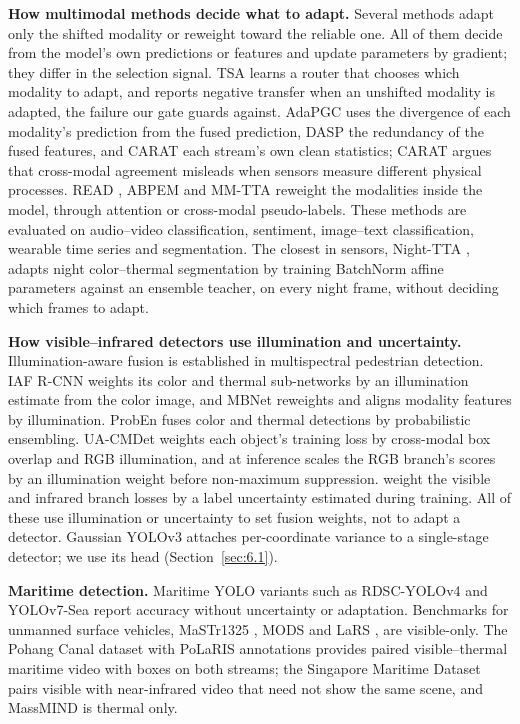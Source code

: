 \documentclass[journal]{IEEEtran}
\begin{document}
\textbf{How multimodal methods decide what to adapt.} Several methods adapt only the shifted modality or reweight toward the reliable one. All of them decide from the model's own predictions or features and update parameters by gradient; they differ in the selection signal. TSA \cite{chen2025testtime} learns a router that chooses which modality to adapt, and reports negative transfer when an unshifted modality is adapted, the failure our gate guards against. AdaPGC \cite{xu2026multimodal} uses the divergence of each modality's prediction from the fused prediction, DASP \cite{he2026decoupling} the redundancy of the fused features, and CARAT \cite{mohapatra2026sourcelearned} each stream's own clean statistics; CARAT argues that cross-modal agreement misleads when sensors measure different physical processes. READ \cite{yang2024testtime}, ABPEM \cite{zhao2025attention} and MM-TTA \cite{shin2022mmtta} reweight the modalities inside the model, through attention or cross-modal pseudo-labels. These methods are evaluated on audio--video classification, sentiment, image--text classification, wearable time series and segmentation. The closest in sensors, Night-TTA \cite{liu2024testtime}, adapts night color--thermal segmentation by training BatchNorm affine parameters against an ensemble teacher, on every night frame, without deciding which frames to adapt.

\textbf{How visible--infrared detectors use illumination and uncertainty.} Illumination-aware fusion is established in multispectral pedestrian detection. IAF R-CNN \cite{li2019illuminationaware} weights its color and thermal sub-networks by an illumination estimate from the color image, and MBNet \cite{zhou2020improving} reweights and aligns modality features by illumination. ProbEn \cite{chen2022multimodal} fuses color and thermal detections by probabilistic ensembling. UA-CMDet \cite{sun2022dronebased} weights each object's training loss by cross-modal box overlap and RGB illumination, and at inference scales the RGB branch's scores by an illumination weight before non-maximum suppression. \citet{zhao2024uncertaintyaware} weight the visible and infrared branch losses by a label uncertainty estimated during training. All of these use illumination or uncertainty to set fusion weights, not to adapt a detector. Gaussian YOLOv3 \cite{choi2019gaussian} attaches per-coordinate variance to a single-stage detector; we use its head (Section~\ref{sec:6.1}).

\textbf{Maritime detection.} Maritime YOLO variants such as RDSC-YOLOv4 \cite{liu2021sea} and YOLOv7-Sea \cite{zhao2023yolov7sea} report accuracy without uncertainty or adaptation. Benchmarks for unmanned surface vehicles, MaSTr1325 \cite{bovcon2019the}, MODS \cite{bovcon2022mods} and LaRS \cite{zust2023lars}, are visible-only. The Pohang Canal dataset \cite{chung2023pohang} with PoLaRIS annotations \cite{choi2025polaris} provides paired visible--thermal maritime video with boxes on both streams; the Singapore Maritime Dataset \cite{prasad2017video} pairs visible with near-infrared video that need not show the same scene, and MassMIND \cite{nirgudkar2023massmind} is thermal only.
\end{document}
